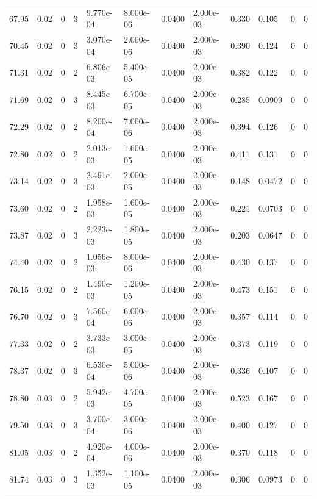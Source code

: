 \documentclass[preview]{standalone}
\begin{document}
{{{\begin{tabular}{L{1.2cm}C{1.2cm} C{0.3cm}C{0.5cm} C{1.4cm}C{1.4cm} C{1.4cm}C{1.4cm} C{1.6cm}C{1.6cm} C{1.6cm}C{1.6cm}}
  67.95  &  0.02  & 0     &  3 &  9.770e-04  & 8.000e-06  &  0.0400&   2.000e-03& 0.330 & 0.105   &  0 & 0  \\ 
  70.45  &  0.02  & 0     &  3 &  3.070e-04  & 2.000e-06  &  0.0400&   2.000e-03& 0.390 & 0.124   &  0 & 0  \\ 
  71.31  &  0.02  & 0     &  2 &  6.806e-03  & 5.400e-05  &  0.0400&   2.000e-03& 0.382 & 0.122   &  0 & 0  \\ 
  71.69  &  0.02  & 0     &  3 &  8.445e-03  & 6.700e-05  &  0.0400&   2.000e-03& 0.285 & 0.0909   &  0 & 0  \\ 
  72.29  &  0.02  & 0     &  2 &  8.200e-04  & 7.000e-06  &  0.0400&   2.000e-03& 0.394 & 0.126   &  0 & 0  \\ 
  72.80  &  0.02  & 0     &  2 &  2.013e-03  & 1.600e-05  &  0.0400&   2.000e-03& 0.411 & 0.131   &  0 & 0  \\ 
  73.14  &  0.02  & 0     &  3 &  2.491e-03  & 2.000e-05  &  0.0400&   2.000e-03& 0.148 & 0.0472   &  0 & 0  \\ 
  73.60  &  0.02  & 0     &  2 &  1.958e-03  & 1.600e-05  &  0.0400&   2.000e-03& 0.221 & 0.0703   &  0 & 0  \\ 
  73.87  &  0.02  & 0     &  3 &  2.223e-03  & 1.800e-05  &  0.0400&   2.000e-03& 0.203 & 0.0647   &  0 & 0  \\ 
  74.40  &  0.02  & 0     &  2 &  1.056e-03  & 8.000e-06  &  0.0400&   2.000e-03& 0.430 & 0.137   &  0 & 0  \\ 
  76.15  &  0.02  & 0     &  2 &  1.490e-03  & 1.200e-05  &  0.0400&   2.000e-03& 0.473 & 0.151   &  0 & 0  \\ 
  76.70  &  0.02  & 0     &  3 &  7.560e-04  & 6.000e-06  &  0.0400&   2.000e-03& 0.357 & 0.114   &  0 & 0  \\ 
  77.33  &  0.02  & 0     &  2 &  3.733e-03  & 3.000e-05  &  0.0400&   2.000e-03& 0.373 & 0.119   &  0 & 0  \\ 
  78.37  &  0.02  & 0     &  3 &  6.530e-04  & 5.000e-06  &  0.0400&   2.000e-03& 0.336 & 0.107   &  0 & 0  \\ 
  78.80  &  0.03  & 0     &  2 &  5.942e-03  & 4.700e-05  &  0.0400&   2.000e-03& 0.523 & 0.167   &  0 & 0  \\ 
  79.50  &  0.03  & 0     &  3 &  3.700e-04  & 3.000e-06  &  0.0400&   2.000e-03& 0.400 & 0.127   &  0 & 0  \\ 
  81.05  &  0.03  & 0     &  2 &  4.920e-04  & 4.000e-06  &  0.0400&   2.000e-03& 0.370 & 0.118   &  0 & 0  \\ 
  81.74  &  0.03  & 0     &  3 &  1.352e-03  & 1.100e-05  &  0.0400&   2.000e-03& 0.306 & 0.0973   &  0 & 0  \\ 

\end{tabular}}}}
\end{document}
